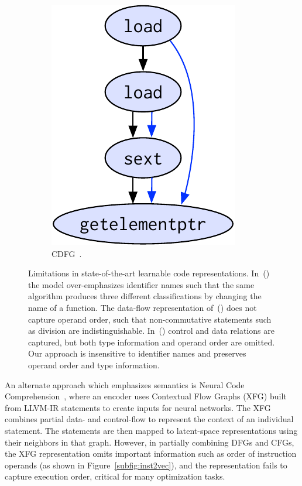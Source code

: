 \begin{figure}[t]
\begin{subfigure}{.18\linewidth}
  \includegraphics[width=\linewidth]{images/cdfg.pdf}
  \caption{CDFG~\cite{Brauckmann2020}.}
  \label{subfig:cdfg}
  \end{subfigure}
  \caption{%
    Limitations in state-of-the-art learnable code
    representations. In~() the model
    over-emphasizes identifier names such that the same algorithm
    produces three different classifications by changing the name of a
    function. The data-flow representation
    of~() does not capture operand order, such
    that non-commutative statements such as division are
    indistinguishable. In~() control and data
    relations are captured, but both type information and operand
    order are omitted. Our approach is insensitive to identifier names
    and preserves operand order and type information.%
  }%
\end{figure}


An alternate approach which emphasizes semantics is Neural Code
Comprehension~\cite{Ben-nun2018}, where an encoder uses Contextual
Flow Graphs (XFG) built from LLVM-IR statements to create inputs for
neural networks. The XFG combines partial data- and control-flow to
represent the context of an individual statement. The statements are
then mapped to latent-space representations using their neighbors in
that graph. However, in partially combining DFGs and CFGs, the XFG
representation omits important information such as order of
instruction operands (as shown in Figure~\ref{subfig:inst2vec}), and
the representation fails to capture execution order, critical for many
optimization tasks.

